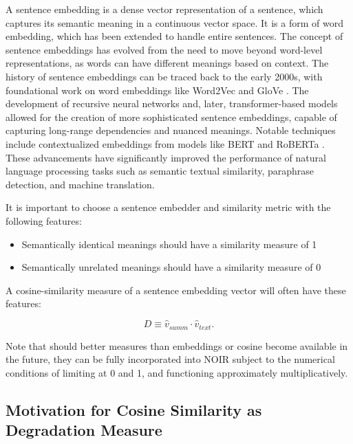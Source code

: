 \documentclass{article}
\begin{document}
A sentence embedding is a dense vector representation of a sentence, which captures its semantic meaning in a continuous vector space. It is a form of word embedding, which has been extended to handle entire sentences. The concept of sentence embeddings has evolved from the need to move beyond word-level representations, as words can have different meanings based on context. The history of sentence embeddings can be traced back to the early 2000s, with foundational work on word embeddings like Word2Vec \citep{mikolov2013efficient} and GloVe \citep{pennington-etal-2014-glove,}. The development of recursive neural networks and, later, transformer-based models allowed for the creation of more sophisticated sentence embeddings, capable of capturing long-range dependencies and nuanced meanings. Notable techniques include contextualized embeddings from models like BERT \citep{DBLP:journals/corr/abs-1810-04805} and RoBERTa \citep{DBLP:journals/corr/abs-1907-11692}. These advancements have significantly improved the performance of natural language processing tasks such as semantic textual similarity, paraphrase detection, and machine translation.

It is important to choose a sentence embedder and similarity metric with the following features: 

\begin{itemize}
	\item Semantically identical meanings should have a similarity measure of 1
	\item Semantically unrelated meanings should have a similarity measure of 0
\end{itemize}

A cosine-similarity measure of a sentence embedding vector will often have these features: 

\begin{equation}
	D \equiv \hat{v}_{summ} \cdot \hat{v}_{text}.
\end{equation}


Note that should better measures than embeddings or cosine become available in the future, they can be fully incorporated into NOIR subject to the numerical conditions of limiting at 0 and 1, and functioning approximately multiplicatively.

\subsection{Motivation for Cosine Similarity as Degradation Measure}
\end{document}
